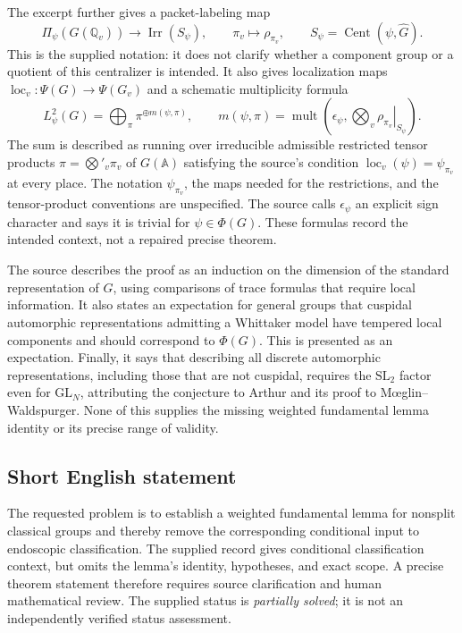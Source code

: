\documentclass[11pt]{article}
\newcommand{\Q}{\mathbb{Q}}
\newcommand{\A}{\mathbb{A}}
\begin{document}
The excerpt further gives a packet-labeling map
\[
\Pi_\psi(G(\Q_v))\longrightarrow\operatorname{Irr}(S_\psi),
\qquad \pi_v\longmapsto\rho_{\pi_v},
\qquad S_\psi=\operatorname{Cent}(\psi,\widehat G).
\]
This is the supplied notation: it does not clarify whether a component group or a quotient of this centralizer is intended. It also gives localization maps \(\operatorname{loc}_v:\Psi(G)\to\Psi(G_v)\) and a schematic multiplicity formula
\[
L^2_\psi(G)=\bigoplus_{\pi}\pi^{\oplus m(\psi,\pi)},
\qquad
m(\psi,\pi)=\operatorname{mult}\!\left(\epsilon_\psi,
\bigotimes_v\left.\rho_{\pi_v}\right|_{S_\psi}\right).
\]
The sum is described as running over irreducible admissible restricted tensor products \(\pi=\bigotimes'_v\pi_v\) of \(G(\A)\) satisfying the source's condition \(\operatorname{loc}_v(\psi)=\psi_{\pi_v}\) at every place. The notation \(\psi_{\pi_v}\), the maps needed for the restrictions, and the tensor-product conventions are unspecified. The source calls \(\epsilon_\psi\) an explicit sign character and says it is trivial for \(\psi\in\Phi(G)\). These formulas record the intended context, not a repaired precise theorem.

The source describes the proof as an induction on the dimension of the standard representation of \(\widehat G\), using comparisons of trace formulas that require local information. It also states an expectation for general groups that cuspidal automorphic representations admitting a Whittaker model have tempered local components and should correspond to \(\Phi(G)\). This is presented as an expectation. Finally, it says that describing all discrete automorphic representations, including those that are not cuspidal, requires the \(\mathrm{SL}_2\) factor even for \(\mathrm{GL}_N\), attributing the conjecture to Arthur and its proof to M\oe glin--Waldspurger. None of this supplies the missing weighted fundamental lemma identity or its precise range of validity.
\subsection{Short English statement}
The requested problem is to establish a weighted fundamental lemma for nonsplit classical groups and thereby remove the corresponding conditional input to endoscopic classification. The supplied record gives conditional classification context, but omits the lemma's identity, hypotheses, and exact scope. A precise theorem statement therefore requires source clarification and human mathematical review. The supplied status is \emph{partially solved}; it is not an independently verified status assessment.
\end{document}
